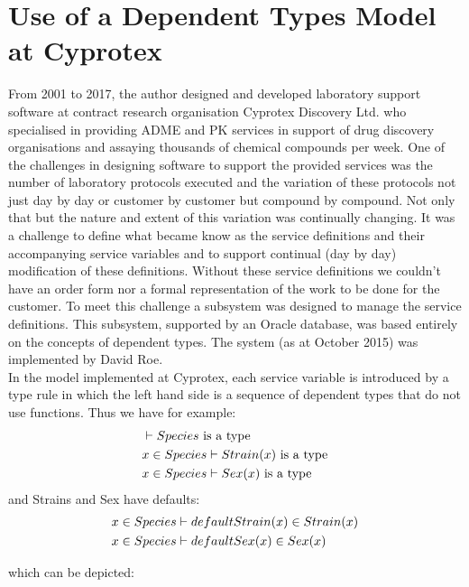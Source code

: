 \documentclass[12pt,a4paper]{article}
\begin{document}
\section{Use of a Dependent Types Model at Cyprotex}
\noindent
From 2001 to 2017, the author designed and developed laboratory support software at contract research organisation Cyprotex Discovery Ltd. who specialised in providing ADME and PK 
services in support of drug discovery organisations and assaying thousands of chemical compounds per week.
One of the challenges in designing software to support the provided services was the number of 
laboratory protocols executed and the variation of these protocols not just day by day or customer by customer but compound by compound. Not only that but the nature and extent of this variation was continually changing. It was a challenge to define what became know as the service definitions and their accompanying service variables and to support continual (day by day) modification of these definitions. Without these service definitions we couldn't have an order form nor a formal representation of the work to be done for the customer.  
\noindent To meet this challenge a subsystem was designed to manage the service definitions.
This subsystem, supported by an Oracle database,  was based entirely on the concepts of dependent types. The system (as at October 2015) was implemented by David Roe. \\

\noindent In the model implemented at Cyprotex, each service variable is introduced by a type rule in which the left hand side is a sequence of dependent types that do not use functions. Thus we have for example:
\begin{align*}
& \vdash Species\mbox{ is a type} \\
& x \in Species\vdash Strain(x)\mbox{ is a type} \\
& x \in Species\vdash Sex(x)\mbox{ is a type} \\
\end{align*}
\noindent and Strains and Sex have defaults:
\begin{align*}
& x \in Species\vdash defaultStrain(x) \in Strain(x) \\
& x \in Species\vdash defaultSex(x) \in Sex(x) \\
\end{align*}

\noindent which can be depicted:
\end{document}
